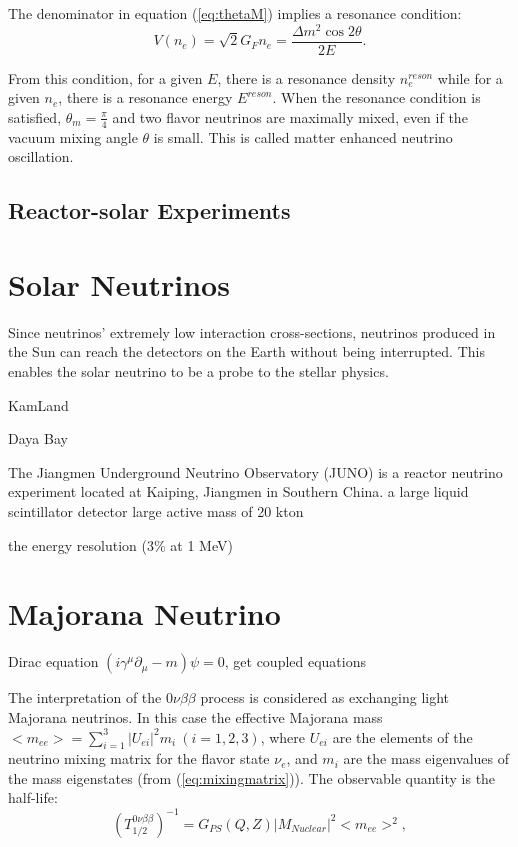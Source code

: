 The denominator in equation (\ref{eq:thetaM}) implies a resonance condition:
\begin{equation}\label{eq:reson_condition}
	V(n_e)=\sqrt 2G_Fn_e=\frac{\Delta m^2\cos2\theta}{2E}.
\end{equation}

From this condition, for a given $E$, there is a resonance density $n^{reson}_e$ while for a given $n_e$, there is a resonance energy $E^{reson}$. When the resonance condition is satisfied, $\theta_m = \frac{\pi}{4}$ and two flavor neutrinos are maximally mixed, even if the vacuum mixing angle $\theta$ is small. This is called matter enhanced neutrino oscillation\cite{smirnov2016solar,fukugita2013physics}.

\subsection{Reactor-solar Experiments}

\section{Solar Neutrinos}

Since neutrinos' extremely low interaction cross-sections, neutrinos produced in the Sun can reach the detectors on the Earth without being interrupted. This enables the solar neutrino to be a probe to the stellar physics.

KamLand

Daya Bay

The Jiangmen Underground Neutrino Observatory (JUNO) is a reactor neutrino experiment located at Kaiping, Jiangmen in Southern China. a large liquid scintillator detector 
large active mass of 20 kton

the energy resolution (3\% at 1 MeV) 
\cite{giaz2018status}



\section{Majorana Neutrino}

Dirac equation $(i\gamma^\mu\partial_\mu-m)\psi=0$,
get coupled equations


The interpretation of the $0\nu\beta\beta$ process is considered as exchanging light Majorana neutrinos. In this case the effective Majorana mass $<m_{ee}>=\sum_{i=1}^{3} |U_{ei}|^2m_i~(i=1,2,3)$, where $U_{ei}$ are the elements of the neutrino mixing matrix for the flavor state $\nu_e$, and $m_i$ are the mass eigenvalues of the mass eigenstates (from (\ref{eq:mixingmatrix})). The observable quantity is the half-life:
\[
(T^{0\nu\beta\beta}_{1/2})^{-1} = G_{PS}(Q,Z)|M_{Nuclear}|^2<m_{ee}>^2, 
\]



